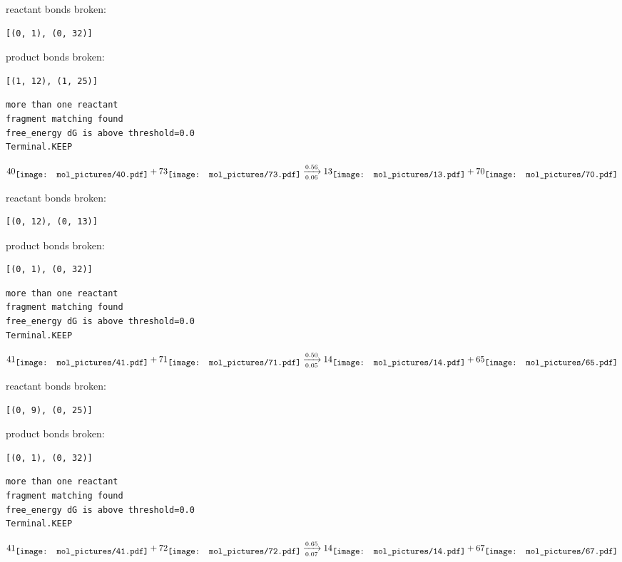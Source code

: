 \documentclass{article}
\begin{document}
reactant bonds broken:\begin{verbatim}
[(0, 1), (0, 32)]
\end{verbatim}
product bonds broken:\begin{verbatim}
[(1, 12), (1, 25)]
\end{verbatim}




\vspace{1cm}
\begin{verbatim}
more than one reactant
fragment matching found
free_energy dG is above threshold=0.0
Terminal.KEEP
\end{verbatim}
$$
40
\raisebox{-.5\height}{\texttt{[image: mol\_pictures/40.pdf]}}
+
73
\raisebox{-.5\height}{\texttt{[image: mol\_pictures/73.pdf]}}
\xrightarrow[0.06]{0.56}
13
\raisebox{-.5\height}{\texttt{[image: mol\_pictures/13.pdf]}}
+
70
\raisebox{-.5\height}{\texttt{[image: mol\_pictures/70.pdf]}}
$$


reactant bonds broken:\begin{verbatim}
[(0, 12), (0, 13)]
\end{verbatim}
product bonds broken:\begin{verbatim}
[(0, 1), (0, 32)]
\end{verbatim}




\vspace{1cm}
\begin{verbatim}
more than one reactant
fragment matching found
free_energy dG is above threshold=0.0
Terminal.KEEP
\end{verbatim}
$$
41
\raisebox{-.5\height}{\texttt{[image: mol\_pictures/41.pdf]}}
+
71
\raisebox{-.5\height}{\texttt{[image: mol\_pictures/71.pdf]}}
\xrightarrow[0.05]{0.50}
14
\raisebox{-.5\height}{\texttt{[image: mol\_pictures/14.pdf]}}
+
65
\raisebox{-.5\height}{\texttt{[image: mol\_pictures/65.pdf]}}
$$


reactant bonds broken:\begin{verbatim}
[(0, 9), (0, 25)]
\end{verbatim}
product bonds broken:\begin{verbatim}
[(0, 1), (0, 32)]
\end{verbatim}




\vspace{1cm}
\begin{verbatim}
more than one reactant
fragment matching found
free_energy dG is above threshold=0.0
Terminal.KEEP
\end{verbatim}
$$
41
\raisebox{-.5\height}{\texttt{[image: mol\_pictures/41.pdf]}}
+
72
\raisebox{-.5\height}{\texttt{[image: mol\_pictures/72.pdf]}}
\xrightarrow[0.07]{0.65}
14
\raisebox{-.5\height}{\texttt{[image: mol\_pictures/14.pdf]}}
+
67
\raisebox{-.5\height}{\texttt{[image: mol\_pictures/67.pdf]}}
$$
\end{document}
